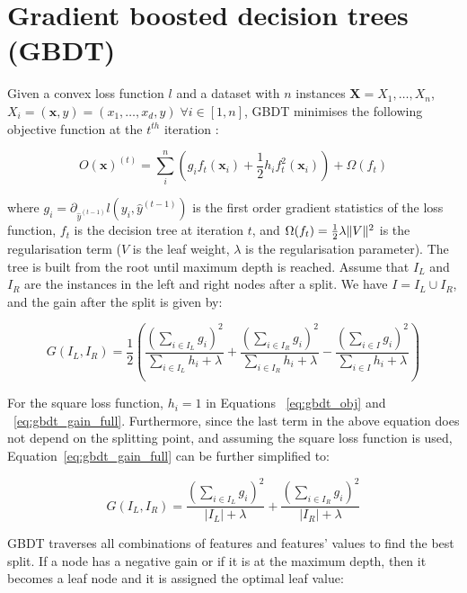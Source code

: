 \section{Gradient boosted decision trees (GBDT)}

Given a convex loss function $l$ and a dataset with $n$ instances $\textbf{X} = X_1,\dots,X_n$, $X_i = (\textbf{x}, y) = (x_1, \dots,x_d, y) \; \forall i \in [1,n]$, GBDT minimises the following objective function at the $t^{th}$ iteration \cite{gbdt_high_dim}:

\begin{equation}\label{eq:gbdt_obj}
	O(\textbf{x})^{(t)} = \sum_i^n \left( g_i f_t (\textbf{x}_i) + \frac{1}{2} h_i f_t^2 (\textbf{x}_i) \right) + \Omega(f_t)
\end{equation}

where $g_i = \partial_{\hat{y}^{(t-1)}}l(y_i, \hat{y}^{(t-1)})$ is the first order gradient statistics of the loss function, $f_t$ is the decision tree at iteration $t$, and $\Omega(f_t) = \frac{1}{2} \lambda \lVert V\rVert^2$ is the regularisation term ($V$ is the leaf weight, $\lambda$ is the regularisation parameter). The tree is built from the root until maximum depth is reached. Assume that $I_L$ and $I_R$ are the instances in the left and right nodes after a split. We have $I = I_L \cup I_R$, and the gain after the split is given by: \cite{xgboost}

\begin{equation}\label{eq:gbdt_gain_full}
	G(I_L, I_R) = \frac{1}{2} \left( \frac{(\sum_{i \in I_L}g_i)^2}{\sum_{i \in I_L} h_i + \lambda} + \frac{(\sum_{i \in I_R}g_i)^2}{\sum_{i \in I_R} h_i + \lambda} - \frac{(\sum_{i \in I}g_i)^2}{\sum_{i \in I} h_i + \lambda} \right)
\end{equation}

For the square loss function, $h_i = 1$ in Equations ~\ref{eq:gbdt_obj} and ~\ref{eq:gbdt_gain_full}. Furthermore, since the last term in the above equation does not depend on the splitting point, and assuming the square loss function is used, Equation~\ref{eq:gbdt_gain_full} can be further simplified to: \cite{dpgbdt}

\begin{equation}\label{eq:gbdt_gain_simplified}
	G(I_L, I_R) = \frac{(\sum_{i \in I_L}g_i)^2}{|I_L| + \lambda} + \frac{(\sum_{i \in I_R}g_i)^2}{|I_R| + \lambda}
\end{equation}

GBDT traverses all combinations of features and features' values to find the best split. If a node has a negative gain or if it is at the maximum depth, then it becomes a leaf node and it is assigned the optimal leaf value:

